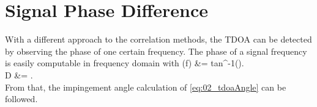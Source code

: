 \section{Signal Phase Difference}
\label{sec:02_phase}

With a different approach to the correlation methods, the \ac{TDOA} can be
detected by observing the phase of one certain frequency.
The phase of a signal frequency is easily computable in frequency domain
with
\bal
    \phi(f) &= tan^{-1}().\\
    D &= .\\
\eal
From that, the impingement angle calculation of \cref{eq:02_tdoaAngle} can
be followed.